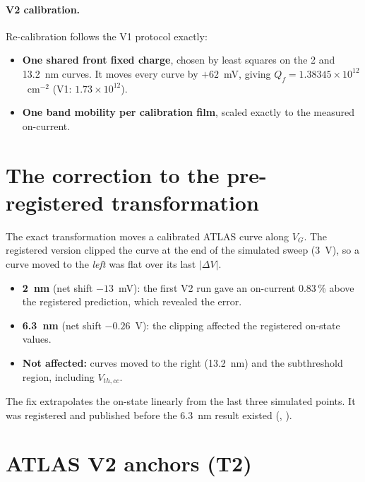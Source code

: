 \paragraph{V2 calibration.} Re-calibration follows the V1 protocol exactly:
\begin{itemize}
\item \textbf{One shared front fixed charge}, chosen by least squares on the 2 and 13.2~nm curves. It moves every curve
by $+62$~mV, giving $Q_f = 1.38345\times10^{12}$~cm$^{-2}$ (V1: $1.73\times10^{12}$).
\item \textbf{One band mobility per calibration film}, scaled exactly to the measured on-current.
\end{itemize}

\section{The correction to the pre-registered transformation}
\label{sec:v2-correction}

The exact transformation moves a calibrated ATLAS curve along $V_G$. The registered version clipped the curve at the
end of the simulated sweep (3~V), so a curve moved to the \emph{left} was flat over its last $|\Delta V|$.
\begin{itemize}
\item \textbf{2~nm} (net shift $-13$~mV): the first V2 run gave an on-current 0.83\,\% above the registered prediction,
which revealed the error.
\item \textbf{6.3~nm} (net shift $-0.26$~V): the clipping affected the registered on-state values.
\item \textbf{Not affected:} curves moved to the right (13.2~nm) and the subthreshold region, including $V_{th,cc}$.
\end{itemize}
The fix extrapolates the on-state linearly from the last three simulated points. It was registered and published
before the 6.3~nm result existed (, ).

\section{ATLAS V2 anchors (T2)}
\label{sec:v2-anchors}

